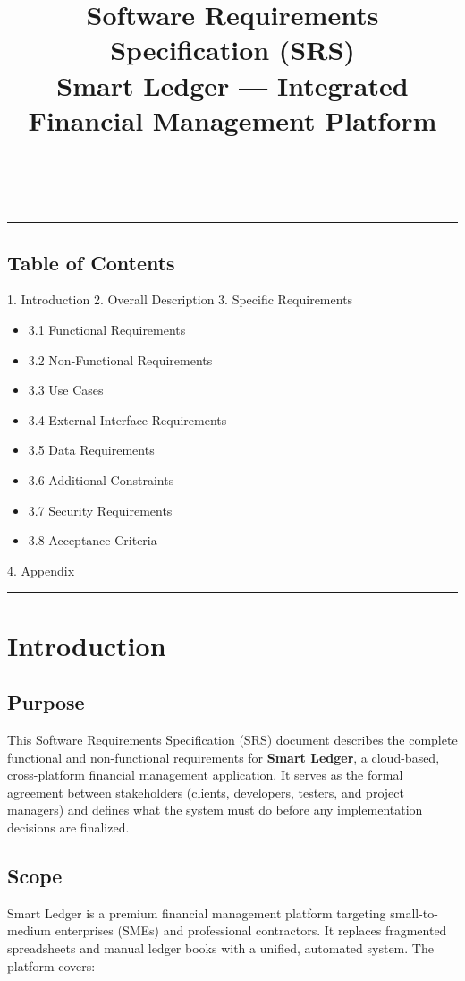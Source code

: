\documentclass[journal, a4paper, onecolumn, 12pt]{IEEEtran}
\title{Software Requirements Specification (SRS) \\ \Large Smart Ledger — Integrated Financial Management Platform}
\author{\IEEEauthorblockN{Project Team}\\ \IEEEauthorblockA{\textit{Smart Ledger Project} \\ May 11, 2026}}
\begin{document}
\maketitle
\tableofcontents
\newpage

\vspace{1em}\hrule\vspace{1em}

\subsection{Table of Contents}
1. Introduction
2. Overall Description
3. Specific Requirements
\begin{itemize}[leftmargin=*]
\item 3.1 Functional Requirements
\item 3.2 Non-Functional Requirements
\item 3.3 Use Cases
\item 3.4 External Interface Requirements
\item 3.5 Data Requirements
\item 3.6 Additional Constraints
\item 3.7 Security Requirements
\item 3.8 Acceptance Criteria
\end{itemize}
4. Appendix

\vspace{1em}\hrule\vspace{1em}

\section{Introduction}

\subsection{Purpose}
This Software Requirements Specification (SRS) document describes the complete functional and non-functional requirements for \textbf{Smart Ledger}, a cloud-based, cross-platform financial management application. It serves as the formal agreement between stakeholders (clients, developers, testers, and project managers) and defines what the system must do before any implementation decisions are finalized.

\subsection{Scope}
Smart Ledger is a premium financial management platform targeting small-to-medium enterprises (SMEs) and professional contractors. It replaces fragmented spreadsheets and manual ledger books with a unified, automated system. The platform covers:
\end{document}
